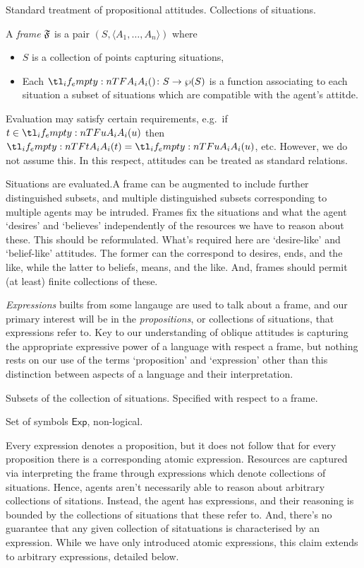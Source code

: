 \documentclass[10pt]{article}
\begin{document}
Standard treatment of propositional attitudes.
Collections of situations.

\begin{definition}[Frame]
  A \emph{frame} \(\mathfrak{F}\) is a pair \((S,\langle A_{1},\dots,A_{n} \rangle)\) where
  \begin{itemize}
  \item \(S\) is a collection of points capturing situations,
  \item Each \(\fatt{} \colon S \to \wp(S)\) is a function associating to each situation a subset of situations which are compatible with the agent's attitde.
  \end{itemize}
  Evaluation may satisfy certain requirements, e.g.\ if \(t \in \fatt{u}\) then \(\fatt{t} = \fatt{u}\), etc.
  However, we do not assume this.
  In this respect, attitudes can be treated as standard relations.
\end{definition}
Situations are evaluated.A frame can be augmented to include further distinguished subsets, and multiple distinguished subsets corresponding to multiple agents may be intruded.
Frames fix the situations and what the agent `desires' and `believes' independently of the resources we have to reason about these.
{\color{red} This should be reformulated.
  What's required here are `desire-like' and `belief-like' attitudes.
  The former can the correspond to desires, ends, and the like, while the latter to beliefs, means, and the like.
  And, frames should permit (at least) finite collections of these.}

\emph{Expressions} builts from some langauge are used to talk about a frame, and our primary interest will be in the \emph{propositions}, or collections of situations, that expressions refer to.
Key to our understanding of oblique attitudes is capturing the appropriate expressive power of a language with respect a frame, but nothing rests on our use of the terms `proposition' and `expression' other than this distinction between aspects of a language and their interpretation.

\begin{definition}[Propositions]
  Subsets of the collection of situations.
  Specified with respect to a frame.
\end{definition}

\begin{definition}
  Set of symbols \(\mathsf{Exp}\), non-logical.
\end{definition}

Every expression denotes a proposition, but it does not follow that for every proposition there is a corresponding atomic expression.
Resources are captured via interpreting the frame through expressions which denote collections of situations.
Hence, agents aren't necessarily able to reason about arbitrary collections of sitations.
Instead, the agent has expressions, and their reasoning is bounded by the collections of situations that these refer to.
And, there's no guarantee that any given collection of sitatuations is characterised by an expression.
While we have only introduced atomic expressions, this claim extends to arbitrary expressions, detailed below.
\end{document}
